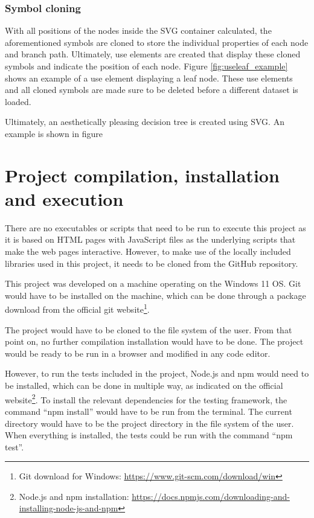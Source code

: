\subsubsection{Symbol cloning}
With all positions of the nodes inside the SVG container calculated, the aforementioned symbols are cloned to store the individual properties of each node and branch path. Ultimately, use elements are created that display these cloned symbols and indicate the position of each node. Figure \ref{fig:useleaf_example} shows an example of a use element displaying a leaf node.
These use elements and all cloned symbols are made sure to be deleted before a different dataset is loaded.

Ultimately, an aesthetically pleasing decision tree is created using SVG. An example is shown in figure

\section{Project compilation, installation and execution}
There are no executables or scripts that need to be run to execute this project as it is based on HTML pages with JavaScript files as the underlying scripts that make the web pages interactive. However, to make use of the locally included libraries used in this project, it needs to be cloned from the GitHub repository.

This project was developed on a machine operating on the Windows 11 OS. Git would have to be installed on the machine, which can be done through a package download from the official git website\footnote{Git download for Windows: \url{https://www.git-scm.com/download/win}}.

The project would have to be cloned to the file system of the user. From that point on, no further compilation installation would have to be done. The project would be ready to be run in a browser and modified in any code editor.

However, to run the tests included in the project, Node.js and npm would need to be installed, which can be done in multiple way, as indicated on the official website\footnote{Node.js and npm installation: \url{https://docs.npmjs.com/downloading-and-installing-node-js-and-npm}}. To install the relevant dependencies for the testing framework, the command ``npm install'' would have to be run from the terminal. The current directory would have to be the project directory in the file system of the user. When everything is installed, the tests could be run with the command ``npm test''.

